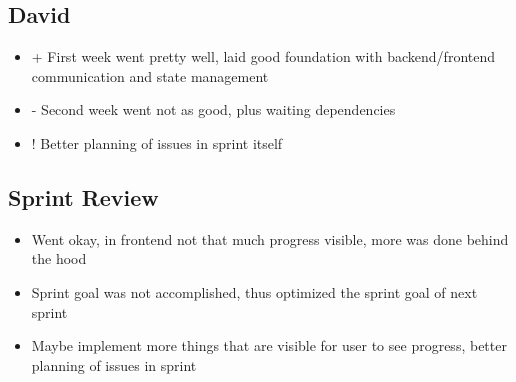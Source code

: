 \subsection{David}
\begin{itemize}
    \item + First week went pretty well, laid good foundation with backend/frontend communication and state management
    \item - Second week went not as good, plus waiting dependencies 
    \item ! Better planning of issues in sprint itself
\end{itemize}

\subsection{Sprint Review}
\begin{itemize}
    \item Went okay, in frontend not that much progress visible, more was done behind the hood
    \item Sprint goal was not accomplished, thus optimized the sprint goal of next sprint
    \item Maybe implement more things that are visible for user to see progress, better planning of issues in sprint
\end{itemize}
